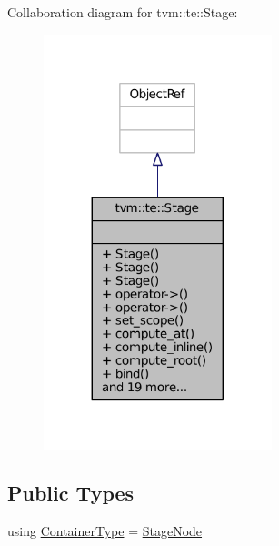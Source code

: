 Collaboration diagram for tvm\+:\+:te\+:\+:Stage\+:
\nopagebreak
\begin{figure}[H]
\begin{center}
\leavevmode
\includegraphics[width=188pt]{classtvm_1_1te_1_1Stage__coll__graph}
\end{center}
\end{figure}
\subsection*{Public Types}
\begin{DoxyCompactItemize}
\item 
using \hyperlink{classtvm_1_1te_1_1Stage_abf9765aa226d6ec0930cb202a392e041}{Container\+Type} = \hyperlink{classtvm_1_1te_1_1StageNode}{Stage\+Node}
\end{DoxyCompactItemize}

